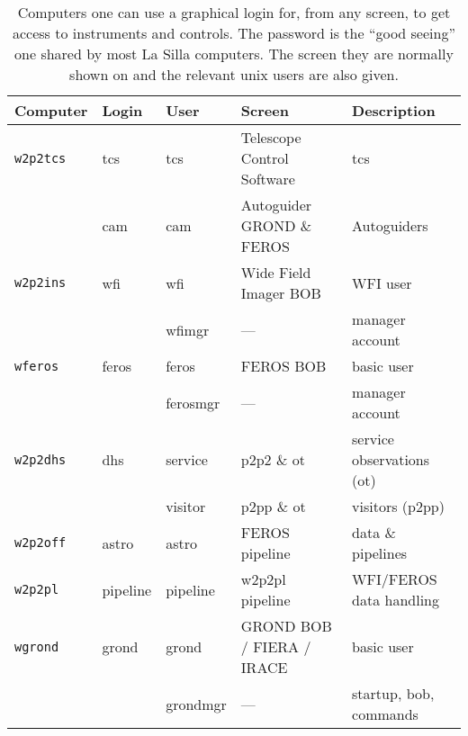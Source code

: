 \documentclass[11pt,fleqn]{book} %
\begin{document}
\begin{table}
    \caption[Main workstations and users]{Computers one can use a graphical login for, from any screen, to get access to instruments and controls.  The password is the ``good seeing'' one shared by most  La Silla computers. The screen they are normally shown on and the relevant unix users are also given.  }
\label{fig:computers}
\centering
\begin{tabular}{lllll}
\hline
Computer         & Login    & User     & Screen                     & Description\\\hline\hline
\texttt{w2p2tcs} & tcs      & tcs      & Telescope Control Software & \gls{tcs}\\
                 & cam      & cam      & Autoguider GROND \& FEROS  & Autoguiders\\
\texttt{w2p2ins} & wfi      & wfi      & Wide Field Imager BOB      & WFI user\\
                 &          & wfimgr   & ---                        & manager account\\
\texttt{wferos}  & feros    & feros    & FEROS BOB                  & basic user\\
                 &          & ferosmgr & ---                        & manager account\\
\texttt{w2p2dhs} & dhs      & service  & p2p2 \& ot                 & service observations (ot)\\
                 &          & visitor  & p2pp \& ot                 & visitors (p2pp)\\
\texttt{w2p2off} & astro    & astro    & FEROS pipeline             & data \& pipelines\\
\texttt{w2p2pl}  & pipeline & pipeline & w2p2pl pipeline            & WFI/FEROS data handling\\       
\texttt{wgrond}  & grond    & grond    & GROND BOB / FIERA / IRACE  & basic user\\
                 &          & grondmgr & ---                        & startup, \gls{bob}, commands\\
\hline
\end{tabular}
\end{table}
\end{document}
